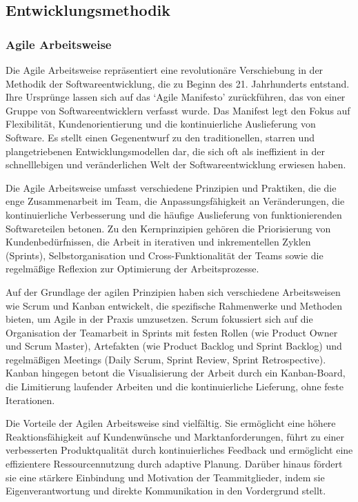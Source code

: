 \documentclass[../main.tex]{subfiles}
\begin{document}
\subsection{Entwicklungsmethodik}

\subsubsection{Agile Arbeitsweise}

Die Agile Arbeitsweise repräsentiert eine revolutionäre Verschiebung in der Methodik der Softwareentwicklung, die zu Beginn des 21.
Jahrhunderts entstand. Ihre Ursprünge lassen sich auf das `Agile Manifesto' zurückführen, das von einer Gruppe von Softwareentwicklern
verfasst wurde. Das Manifest legt den Fokus auf Flexibilität, Kundenorientierung und die kontinuierliche Auslieferung von Software. Es
stellt einen Gegenentwurf zu den traditionellen, starren und plangetriebenen Entwicklungsmodellen dar, die sich oft als ineffizient in
der schnelllebigen und veränderlichen Welt der Softwareentwicklung erwiesen haben.

Die Agile Arbeitsweise umfasst verschiedene Prinzipien und Praktiken, die die enge Zusammenarbeit im Team, die Anpassungsfähigkeit an
Veränderungen, die kontinuierliche Verbesserung und die häufige Auslieferung von funktionierenden Softwareteilen betonen. Zu den
Kernprinzipien gehören die Priorisierung von Kundenbedürfnissen, die Arbeit in iterativen und inkrementellen Zyklen (Sprints),
Selbstorganisation und Cross-Funktionalität der Teams sowie die regelmäßige Reflexion zur Optimierung der Arbeitsprozesse.

Auf der Grundlage der agilen Prinzipien haben sich verschiedene Arbeitsweisen wie Scrum und Kanban entwickelt, die spezifische
Rahmenwerke und Methoden bieten, um Agile in der Praxis umzusetzen. Scrum fokussiert sich auf die Organisation der Teamarbeit in
Sprints mit festen Rollen (wie Product Owner und Scrum Master), Artefakten (wie Product Backlog und Sprint Backlog) und regelmäßigen
Meetings (Daily Scrum, Sprint Review, Sprint Retrospective). Kanban hingegen betont die Visualisierung der Arbeit durch ein Kanban-Board,
die Limitierung laufender Arbeiten und die kontinuierliche Lieferung, ohne feste Iterationen.

Die Vorteile der Agilen Arbeitsweise sind vielfältig. Sie ermöglicht eine höhere Reaktionsfähigkeit auf Kundenwünsche und Marktanforderungen,
führt zu einer verbesserten Produktqualität durch kontinuierliches Feedback und ermöglicht eine effizientere Ressourcennutzung durch adaptive
Planung. Darüber hinaus fördert sie eine stärkere Einbindung und Motivation der Teammitglieder, indem sie Eigenverantwortung und direkte
Kommunikation in den Vordergrund stellt.
\end{document}
